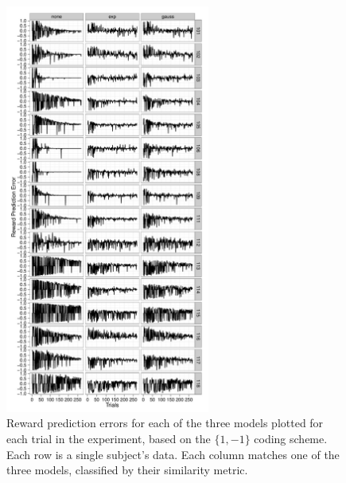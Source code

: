 \documentclass[doc,12pt]{apa}        %
\begin{document}
\begin{figure}[tp]
	\includegraphics[width=0.6\textwidth]{f_rpe_gl}
    \centering
	\caption{Reward prediction errors for each of the three models plotted for each trial in the experiment, based on the $\{1,-1\}$ coding scheme.   Each row is a single subject's data.  Each column matches one of the three models, classified by their similarity metric.}
	\label{fig:rpegl}
\end{figure}
\end{document}
